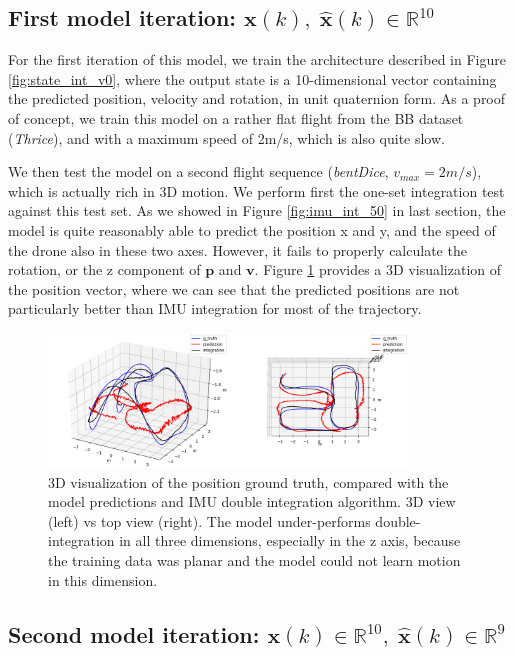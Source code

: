 \subsection{First model iteration: $\mathbf{x}(k),\; \mathbf{\hat{x}}(k)\in\mathbb{R}^{10}$}
For the first iteration of this model, we train the architecture described in Figure \ref{fig:state_int_v0}, where the output state is a 10-dimensional vector containing the predicted position, velocity and rotation, in unit quaternion form. 
As a proof of concept, we train this model on a rather flat flight from the BB dataset (\emph{Thrice}), and with a maximum speed of 2m/s, which is also quite slow. 

We then test the model on a second flight sequence (\emph{bentDice}, $v_{max}=2m/s$), which is actually rich in 3D motion.
We perform first the one-set integration test against this test set. 
As we showed in Figure \ref{fig:imu_int_50} in last section, the model is quite reasonably able to predict the position x and y, and the speed of the drone also in these two axes. 
However, it fails to properly calculate the rotation, or the z component of $\mathbf{p}$ and $\mathbf{v}$. 
Figure \ref{fig:imu_int_50_r10_3d} provides a 3D visualization of the position vector, where we can see that the predicted positions are not particularly better than IMU integration for most of the trajectory.

\begin{figure}[h]
   \centering
   \includegraphics[width=0.85\textwidth]{thesis_template/img/imu_int_50_3d.jpg}
   \caption{3D visualization of the position ground truth, compared with the model predictions and IMU double integration algorithm. 
   3D view (left) vs top view (right). The model under-performs double-integration in all three dimensions, especially in the z axis, because the training data was planar and the model could not learn motion in this dimension.}
   \label{fig:imu_int_50_r10_3d}
\end{figure}

\subsection{Second model iteration: $\mathbf{x}(k)\in\mathbb{R}^{10},\; \mathbf{\hat{x}}(k)\in\mathbb{R}^{9}$}\label{sec:exp_imu_int_so3}

